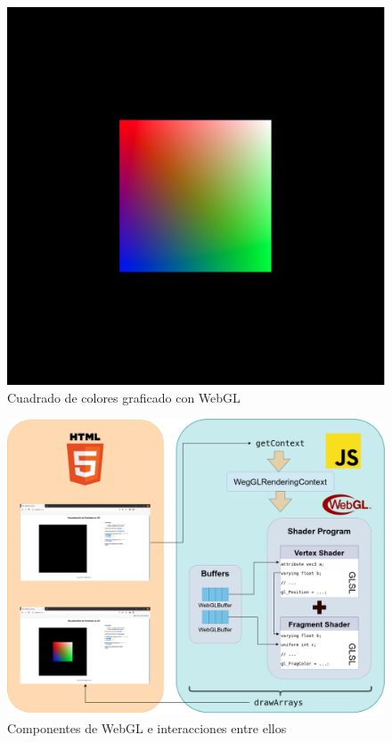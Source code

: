 \begin{figure} [ht]
    \centering
    \includegraphics[scale = 0.25]{img/C5/ejemplo-shaders.png}
    \caption{Cuadrado de colores graficado con WebGL}
    \label{fig:ejemplo-wgl}
\end{figure}

\begin{figure} [ht]
    \centering
    \includegraphics[scale = 0.3]{img/C5/WEBGL-workflow.drawio.png}
    \caption{Componentes de WebGL e interacciones entre ellos}
    \label{fig:componentes-wgl}
\end{figure}


